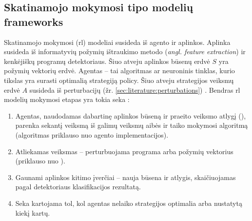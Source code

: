 \subsection{Skatinamojo mokymosi tipo modelių \glspl{framework}}\label{sec:literature:rl}

Skatinamojo mokymosi (\acs{rl}) modeliai susideda iš agento ir aplinkos.
Aplinka susideda iš informatyvių požymių ištraukimo metodo (\textit{angl.
    feature extraction}) ir kenkėjiškų programų detektoriaus. Šiuo atveju aplinkos
būsenų erdvė $S$ yra požymių vektorių erdvė. Agentas -- tai algoritmas ar
neuroninis tinklas, kurio tikslas yra surasti optimalią strategiją
\gls{policy}. Šiuo atveju strategijos veiksmų erdvė $A$ susideda iš
perturbacijų (žr. \ref{sec:literature:perturbations}) \cite{fangEvadingMalwareEngines2019}. Bendras
\ac{rl} modelių mokymosi etapas yra tokia seka \cite{fangEvadingMalwareEngines2019, zhongReinforcementLearningBased2022}:
\begin{enumerate}
    \item Agentas, naudodamas dabartinę aplinkos būseną ir praeito veiksmo atlygį
          (), parenka sekantį veiksmą iš galimų veiksmų aibės ir taiko
          mokymosi algoritmą (algoritmas priklauso nuo agento implementacijos).
    \item Atliekamas veiksmas -- perturbuojama programa arba požymių vektorius (priklauso
          nuo ).
    \item Gaunami aplinkos kitimo įverčiai -- nauja būsena ir atlygis, skaičiuojamas
          pagal detektoriaus klasifikacijos rezultatą.
    \item Seka kartojama tol, kol agentas nelaiko strategijos optimalia arba nustatytą
          kiekį kartų.
\end{enumerate}

